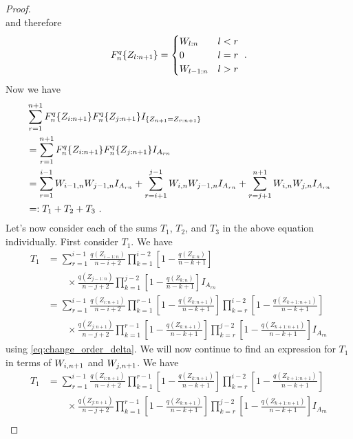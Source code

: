\begin{proof}
\begin{equation}
\end{equation}
and therefore 
\begin{equation}
F_n^q\{Z_{l:n+1}\} = \begin{cases} 
W_{l:n} & l<r \\
0 & l=r\\
W_{l-1:n} & l>r
\end{cases}\textrm{ .}
\label{eq:change_order_w}
\end{equation}
%
Now we have
\begin{align}
&  \sum\limits_{r=1}^{n+1}F_n^q\{Z_{i:n+1}\}F_n^q\{Z_{j:n+1}\}I_{\{Z_{n+1}=Z_{r:n+1}\}}\nonumber\\
&= \sum\limits_{r=1}^{n+1}F_n^q\{Z_{i:n+1}\}F_n^q\{Z_{j:n+1}\}I_{A_{rn}}\nonumber\\
&= \sum\limits_{r=1}^{i-1}W_{i-1,n}W_{j-1,n}I_{A_{rn}} + \sum\limits_{r=i+1}^{j-1}W_{i,n}W_{j-1,n}I_{A_{rn}} + \sum\limits_{r=j+1}^{n+1}W_{i,n}W_{j,n}I_{A_{rn}}\nonumber\\
&=: T_1 + T_2 + T_3\textrm{ .}
\label{eq:sum_t}
\end{align}
%
Let's now consider each of the sums $T_1$, $T_2$, and $T_3$ in the above equation individually. First consider $T_1$. We have
\begin{align*}
T_1 &= \sum\limits_{r=1}^{i-1} \frac{q(Z_{i-1:n})}{n-i+2} \prod\limits_{k=1}^{i-2}\left[1-\frac{q(Z_{k:n})}{n-k+1}\right]\\
    &\qquad \times \frac{q(Z_{j-1:n})}{n-j+2} \prod\limits_{k=1}^{j-2}\left[1-\frac{q(Z_{k:n})}{n-k+1}\right]I_{A_{rn}}\\
	&= \sum\limits_{r=1}^{i-1} \frac{q(Z_{i:n+1})}{n-i+2} \prod_{k=1}^{r-1}\left[1-\frac{q(Z_{k:n+1})}{n-k+1}\right]\prod_{k=r}^{i-2}\left[1-\frac{q(Z_{k+1:n+1})}{n-k+1}\right]\\
	&\qquad \times \frac{q(Z_{j:n+1})}{n-j+2} \prod_{k=1}^{r-1}\left[1-\frac{q(Z_{k:n+1})}{n-k+1}\right]\prod_{k=r}^{j-2}\left[1-\frac{q(Z_{k+1:n+1})}{n-k+1}\right]I_{A_{rn}}
\end{align*}
using \eqref{eq:change_order_delta}. We will now continue to find an expression for $T_1$ in terms of $W_{i,n+1}$ and $W_{j,n+1}$. We have
\begin{align*}		
	T_1	&= \sum\limits_{r=1}^{i-1} \frac{q(Z_{i:n+1})}{n-i+2} \prod_{k=1}^{r-1}\left[1-\frac{q(Z_{k:n+1})}{n-k+1}\right]\prod_{k=r}^{i-2}\left[1-\frac{q(Z_{k+1:n+1})}{n-k+1}\right]\\
		& \qquad \times \frac{q(Z_{j:n+1})}{n-j+2} \prod_{k=1}^{r-1}\left[1-\frac{q(Z_{k:n+1})}{n-k+1}\right]\prod_{k=r}^{j-2}\left[1-\frac{q(Z_{k+1:n+1})}{n-k+1}\right]I_{A_{rn}}\\

\end{align*}
\end{proof}
